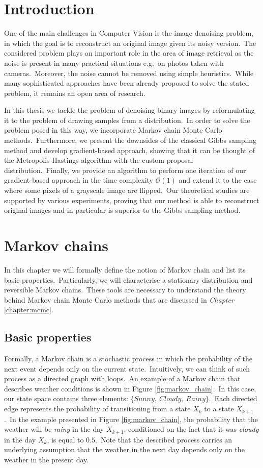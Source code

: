 \documentclass[shortabstract, english, lic]{iithesis}
\author         {Dawid Wegner}
\date           {29 sierpnia 2021}
\newcommand\numberedchapter[1]{\setlength\topskip{3cm}\chapter{#1}\setlength\topskip{0cm}}
\theoremstyle{default_theorem_style}\newtheorem{theorem}{Theorem}
\theoremstyle{default_theorem_style}\newtheorem{definition}{Definition}
\begin{document}
\numberedchapter{Introduction}

One of the main challenges in Computer Vision is the image denoising problem, in which the goal is to reconstruct an
original image given its noisy version.\ The considered problem plays an important role in the area of image
retrieval as the noise is present in many practical situations e.g.\ on photos taken with cameras.\ Moreover, the noise
cannot be removed using simple heuristics.\ While many sophisticated approaches have been already proposed to solve
the stated problem, it remains an open area of research.\newline

\noindent In this thesis we tackle the problem of denoising binary images by reformulating it to the problem of
drawing samples from a distribution.\ In order to solve the problem posed in this way, we incorporate Markov chain
Monte Carlo methods.\ Furthermore, we present the downsides of the classical Gibbs sampling method and develop
gradient-based approach, showing that it can be thought of the Metropolis-Hastings algorithm with the custom proposal
distribution.\ Finally, we provide an algorithm to perform one iteration of our gradient-based approach in the
time complexity $\mathcal{O}(1)$ and extend it to the case where some pixels of a grayscale image are
flipped.\ Our theoretical studies are supported by various experiments, proving that our method is able to
reconstruct original images and in particular is superior to the Gibbs sampling method.

\numberedchapter{Markov chains}

In this chapter we will formally define the notion of Markov chain and list its basic properties.\ Particularly,
we will characterise a stationary distribution and reversible Markov chains.\ These tools are necessary to understand
the theory behind Markov chain Monte Carlo methods that are discussed in \textit{Chapter} \ref{chapter:mcmc}.

\section{Basic properties}

Formally, a Markov chain is a stochastic process in which the probability of the next event depends only on the current
state.\ Intuitively, we can think of such process as a directed graph with loops.\ An example of a Markov chain that
describes weather conditions is shown in Figure \ref{fig:markov_chain}.\ In this case, our state space contains three
elements: $\{Sunny,\ Cloudy,\ Rainy\}$.\ Each directed edge represents the probability of transitioning from a state
$X_k$ to a state $X_{k + 1}$.\ In the example presented in Figure \ref{fig:markov_chain}, the probability that the
weather will be \textit{rainy} in the day $X_{k + 1}$, conditioned on the fact that it was \textit{cloudy} in the
day $X_k$, is equal to $0.5$.\ Note that the described process carries an underlying assumption that the weather in
the next day depends only on the weather in the present day.\newline
\end{document}
